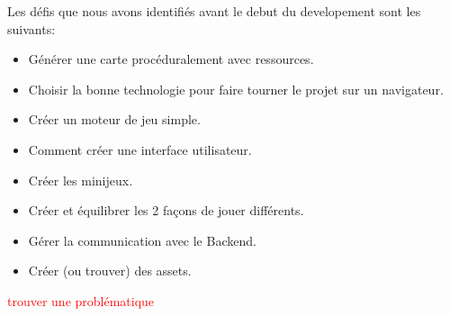         Les défis que nous avons identifiés avant le debut du developement sont les suivants:
        \begin{itemize}
            \item Générer une carte procéduralement avec ressources.
            \item Choisir la bonne technologie pour faire tourner le projet sur un navigateur.
            \item Créer un moteur de jeu simple.
            \item Comment créer une interface utilisateur.
            \item Créer les minijeux.
            \item Créer et équilibrer les 2 façons de jouer différents.
            \item Gérer la communication avec le Backend.
            \item Créer (ou trouver) des assets.
        \end{itemize}


        \textcolor{red}{        trouver une problématique}
